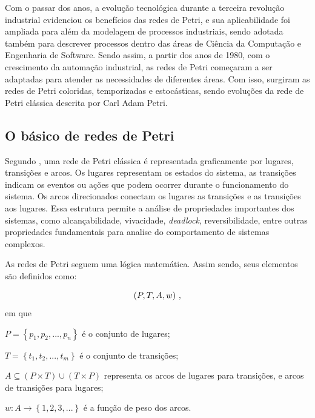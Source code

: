 \documentclass[
	12pt,				%
	openright,			%
	oneside,			%
	a4paper,			%
	english,			%
	brazil				%
	]{abntex2}
\begin{document}
Com o passar dos anos, a evolução tecnológica durante a terceira revolução industrial \cite{coutinho1992terceira} evidenciou os benefícios das redes de Petri, e sua aplicabilidade foi ampliada para além da modelagem de processos industriais, sendo adotada também para descrever processos dentro das áreas de Ciência da Computação e Engenharia de Software. Sendo assim, a partir dos anos de 1980, com o crescimento da automação industrial, as redes de Petri começaram a ser adaptadas para atender as necessidades de diferentes áreas. Com isso, surgiram as redes de Petri coloridas, temporizadas e estocásticas, sendo evoluções da rede de Petri clássica descrita por Carl Adam Petri.  

\subsection*{O básico de redes de Petri}

Segundo \cite{CassandrasLafortune08}, uma rede de Petri clássica é representada graficamente por lugares, transições e arcos. Os lugares representam os estados do sistema, as transições indicam os eventos ou ações que podem ocorrer durante o funcionamento do sistema. Os arcos direcionados conectam os lugares as transições e as transições aos lugares. Essa estrutura permite a análise de propriedades importantes dos sistemas, como alcançabilidade, vivacidade, \textit{deadlock}, reversibilidade, entre outras propriedades fundamentais para analise do comportamento de sistemas complexos. 

As redes de Petri seguem uma lógica matemática. Assim sendo, seus elementos são definidos como:

\begin{equation*}
    \centering
    \left( P, T, A, w \right) \,,
    \label{elementos_rede_petri}
\end{equation*}
em que 

\textbf{$P = \left \{ p_{1},p_{2},...,p_{n} \right \}$} é o conjunto de lugares;

$T = \left \{ t_{1},t_{2},...,t_{m} \right \}$ é o conjunto de transições;

$A \subseteq \left ( P \times T \right ) \cup \left ( T \times P \right )$ representa os arcos de lugares para transições, e arcos de transições para lugares;

$w: A \rightarrow \left \{ 1,2,3,... \right \}$ é a função de peso dos arcos.

\end{document}
